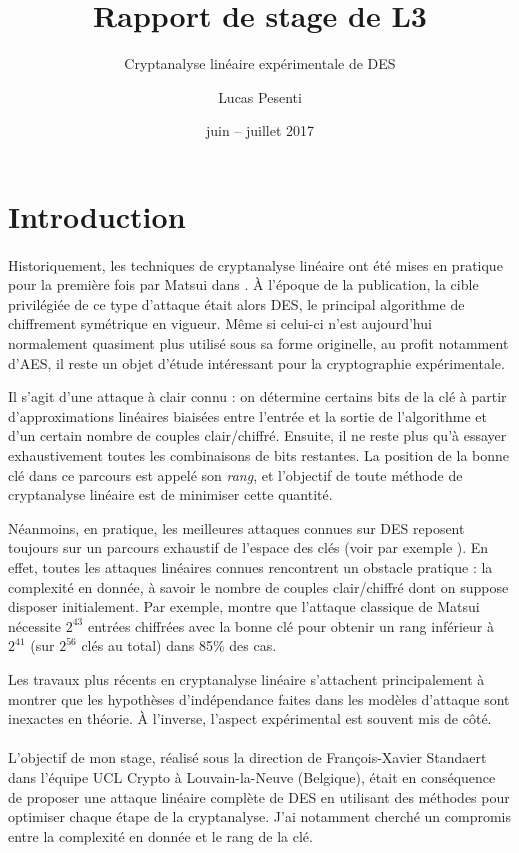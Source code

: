 \documentclass{scrartcl}
\title{Rapport de stage de L3}
\subtitle{Cryptanalyse linéaire expérimentale de DES}
\author{Lucas Pesenti}
\date{juin -- juillet 2017}
\begin{document}
\maketitle
\tableofcontents
\newpage

\section{Introduction}
\paragraph*{}
Historiquement, les techniques de cryptanalyse linéaire ont été mises en pratique pour la première fois
par Matsui dans \cite{Matsui1994}. À l'époque de la publication, la cible privilégiée de ce type
d'attaque était alors DES, le principal algorithme de chiffrement symétrique en vigueur. Même si celui-ci
n'est aujourd'hui normalement quasiment plus utilisé sous sa forme originelle, au profit notamment d'AES,
il reste un objet d'étude intéressant pour la cryptographie expérimentale.

Il s'agit d'une attaque à clair connu : on détermine certains bits de la clé à partir d'approximations
linéaires biaisées entre l'entrée et la sortie de l'algorithme et d'un certain nombre de couples
clair/chiffré. Ensuite, il ne reste plus qu'à essayer exhaustivement toutes les combinaisons de bits restantes. La position
de la bonne clé dans ce parcours est appelé son \textit{rang}, et l'objectif de toute méthode de cryptanalyse
linéaire est de minimiser cette quantité.

Néanmoins, en pratique, les meilleures attaques connues sur DES reposent toujours sur un parcours
exhaustif de l'espace des clés (voir par exemple \cite{crack}). En effet, toutes les attaques linéaires
connues rencontrent un obstacle pratique : la complexité en donnée, à savoir le nombre de couples clair/chiffré
dont on suppose disposer initialement. Par exemple, \cite{Junod2001} montre que l'attaque classique de Matsui
nécessite $2^{43}$ entrées chiffrées avec la bonne clé pour obtenir un rang inférieur à $2^{41}$ (sur
$2^{56}$ clés au total) dans 85\% des cas.

Les travaux plus récents en cryptanalyse linéaire s'attachent principalement à montrer que les
hypothèses d'indépendance faites dans les modèles d'attaque sont inexactes en théorie. À l'inverse, l'aspect
expérimental est souvent mis de côté.

\paragraph*{}
L'objectif de mon stage, réalisé sous la direction de François-Xavier Standaert dans l'équipe
UCL Crypto à Louvain-la-Neuve (Belgique), était en conséquence de proposer une attaque linéaire complète de DES en utilisant
des méthodes pour optimiser chaque étape de la cryptanalyse. J'ai notamment cherché un compromis entre
la complexité en donnée et le rang de la clé.
\end{document}

